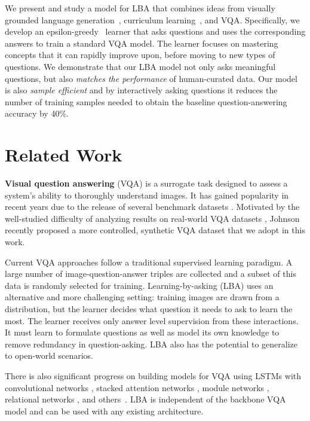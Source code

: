 \documentclass[10pt,twocolumn,letterpaper]{article}
\begin{document}
We present and study a model for LBA that combines ideas from visually grounded language generation~\cite{mostafazadeh16vqg}, curriculum learning~\cite{bengio2009curriculum}, and VQA. Specifically, we develop an epsilon-greedy~\citep{sutton1998reinforcement} learner that asks questions and uses the corresponding answers to train a standard VQA model. The learner focuses on mastering concepts that it can rapidly improve upon, before moving to new types of questions. We demonstrate that our LBA model not only asks meaningful questions, but also \emph{matches the performance} of human-curated data. Our model is also \emph{sample efficient} and by interactively asking questions it reduces the number of training samples needed to obtain the baseline question-answering accuracy by 40\%.










\vspace{-0.06in}
\section{Related Work}
\vspace{-0.05in}
\textbf{Visual question answering} (VQA) is a surrogate task designed to assess a system's ability to thoroughly understand images. It has gained popularity in recent years due to the release of several benchmark datasets \citep{malinowski14multi,antol15vqa,zhu16visual7w}. Motivated by the well-studied difficulty of analyzing results on real-world VQA datasets \citep{jabri16vqa,zhang16yinyang,ray16question}, Johnson \etal \citep{johnson16clevr} recently proposed a more controlled, synthetic VQA dataset that we adopt in this work.

Current VQA approaches follow a traditional supervised learning paradigm. A large number of image-question-answer triples are collected and a subset of this data is randomly selected for training. Learning-by-asking (LBA) uses an alternative and more challenging setting: training images are drawn from a distribution, but the learner decides what question it needs to ask to learn the most. The learner receives only answer level supervision from these interactions. It must learn to formulate questions as well as model its own knowledge to remove redundancy in question-asking. LBA also has the potential to generalize to open-world scenarios.

There is also significant progress on building models for VQA using LSTMs with convolutional networks \citep{lecun1989backpropagation,hochreiter1997long}, stacked attention networks \citep{yang16stacked}, module networks \citep{andreas16module,johnson17module,hu17learning}, relational networks \citep{santoro17relational}, and others~\citep{perez17film}. LBA is independent of the backbone VQA model and can be used with any existing architecture.
\end{document}
